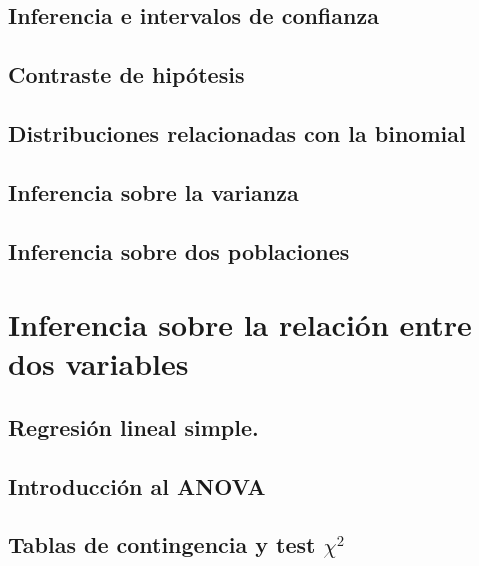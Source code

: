 \documentclass[10pt,a4paper]{book}
\begin{document}
    \chapter{Inferencia e intervalos de confianza}
    

    \chapter{Contraste de hipótesis}
    

    \chapter{Distribuciones relacionadas con la binomial}\label{cap:DistribucionesRelacionadasBinomial}
    

    \chapter{Inferencia sobre la varianza}
    

    \chapter{Inferencia sobre dos poblaciones}\label{cap:Inferencia2Poblaciones}
    

\part{Inferencia sobre la relación entre dos variables}
    

    \chapter{Regresión lineal simple.}
    

    \chapter{Introducción al ANOVA}\label{cap:IntroduccionANOVA}
    

    \chapter{Tablas de contingencia y test $\chi^2$}\label{cap:TablasContingenciaTestChi2}
    
\end{document}
